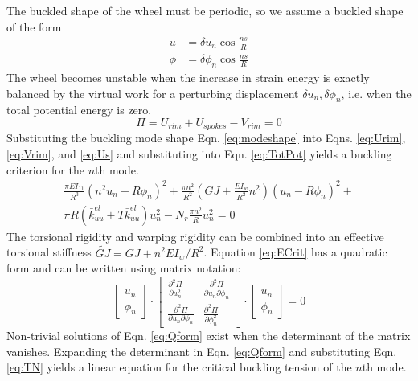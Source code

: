 \documentclass{bmd2016p}
\begin{document}
The buckled shape of the wheel must be periodic, so we assume a buckled shape of the form
	\begin{equation}\label{eq:modeshape}
	\begin{split}
	u &= \delta u_n \cos{\frac{ns}{R}} \\
	\phi &= \delta\phi_n \cos{\frac{ns}{R}}
	\end{split}
	\end{equation}
The wheel becomes unstable when the increase in strain energy is exactly balanced by the virtual work for a perturbing displacement $\delta u_n, \delta\phi_n$, i.e. when the total potential energy is zero.
	\begin{equation}\label{eq:TotPot}
	\Pi = U_{rim} + U_{spokes} - V_{rim} = 0
	\end{equation}
Substituting the buckling mode shape Eqn. \ref{eq:modeshape} into Eqns. \ref{eq:Urim}, \ref{eq:Vrim}, and \ref{eq:Us} and substituting into Eqn. \ref{eq:TotPot} yields a buckling criterion for the $n$th mode.
	\begin{multline}\label{eq:ECrit}
	\frac{\pi EI_{11}}{R^3}(n^2 u_n - R\phi_n)^2 + \frac{\pi n^2}{R^2}\left(GJ + \frac{EI_w}{R^2}n^2\right)(u_n-R\phi_n)^2 + \\
	\pi R(\bar{k}_{uu}^{el} + T\bar{k}_{uu}^{el})u_n^2 - N_r\frac{\pi n^2}{R}u_n^2=0
	\end{multline}
The torsional rigidity and warping rigidity can be combined into an effective torsional stiffness $\widetilde{GJ} = GJ + n^2EI_w/R^2$. Equation \ref{eq:ECrit} has a quadratic form and can be written using matrix notation:
	\begin{equation}\label{eq:Qform}
	\begin{bmatrix}
	u_n\\\phi_n
	\end{bmatrix} \cdot
	\begin{bmatrix}
	\frac{\partial^2 \Pi}{\partial u_n^2} & \frac{\partial^2 \Pi}{\partial u_n \partial \phi_n}\\
	\frac{\partial^2 \Pi}{\partial u_n\partial\phi_n} & \frac{\partial^2 \Pi}{\partial \phi_n^2}
	\end{bmatrix} \cdot
	\begin{bmatrix}
	u_n\\\phi_n
	\end{bmatrix}
	=0
	\end{equation}
Non-trivial solutions of Eqn. \ref{eq:Qform} exist when the determinant of the matrix vanishes. Expanding the determinant in Eqn. \ref{eq:Qform} and substituting Eqn. \ref{eq:TN} yields a linear equation for the critical buckling tension of the $n$th mode.
\end{document}
